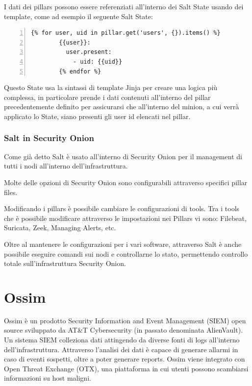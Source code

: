 I dati dei pillars possono essere referenziati all'interno dei Salt State usando dei template, come ad esempio il seguente Salt State:
    \begin{Verbatim}[numbers=left,frame=single,fontsize=\small]
        {% for user, uid in pillar.get('users', {}).items() %}
        {{user}}:
          user.present:
            - uid: {{uid}}
        {% endfor %}
    \end{Verbatim}
Questo State usa la sintassi di template Jinja per creare una logica più complessa, in particolare prende i dati contenuti all'interno del pillar precedentemente definito per assicurarsi che all'interno del minion, a cui verrà applicato lo State, siano presenti gli user id elencati nel pillar.

\subsubsection{Salt in Security Onion}
Come già detto Salt è usato all'interno di Security Onion per il management di tutti i nodi all'interno dell'infrastruttura.

Molte delle opzioni di Security Onion sono configurabili attraverso specifici pillar files.

Modificando i pillars è possibile cambiare le configurazioni di tools. Tra i tools che è possibile modificare attraverso le impostazioni nei Pillars vi sono: Filebeat, Suricata, Zeek, Managing Alerts, etc.


Oltre al mantenere le configurazioni per i vari software, attraverso Salt è anche possibile eseguire comandi sui nodi e controllarne lo stato, permettendo controllo totale sull'infrastruttura Security Onion.


\section{Ossim}
Ossim \cite{ossim} è un prodotto Security Information and Event Management (SIEM)  open source sviluppato da AT\&T Cybersecurity (in passato denominata AlienVault). Un sistema SIEM colleziona dati attingendo da diverse fonti di logs all'interno dell'infrastruttura. 
Attraverso l'analisi dei dati è capace di generare allarmi in caso di eventi sospetti, oltre a poter generare reports.
Ossim viene integrato con Open Threat Exchange (OTX), una piattaforma in cui utenti possono scambiarsi informazioni su host maligni.

